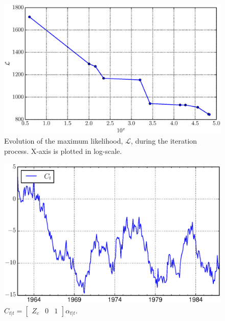 	

	\begin{figure}[h!]
		\centering
		\captionsetup{width=0.6\textwidth, font=small}
		\caption{Evolution of the maximum likelihood, $\mathcal{L}$, during the iteration process. X-axis is plotted in log-scale.}
		\includegraphics[scale=0.5]{fig/L.eps}
	\end{figure}

		\begin{figure}[h!]
		\centering
		\setlength{\abovecaptionskip}{1pt}
		\captionsetup{width=0.6\textwidth, font=small}
		\caption{$C_{t|t} = \begin{bmatrix}
				Z_c & 0 & 1
			\end{bmatrix} \alpha_{t|t}$.}
		\includegraphics[scale=0.6]{fig/CEI.eps}
	\end{figure}
